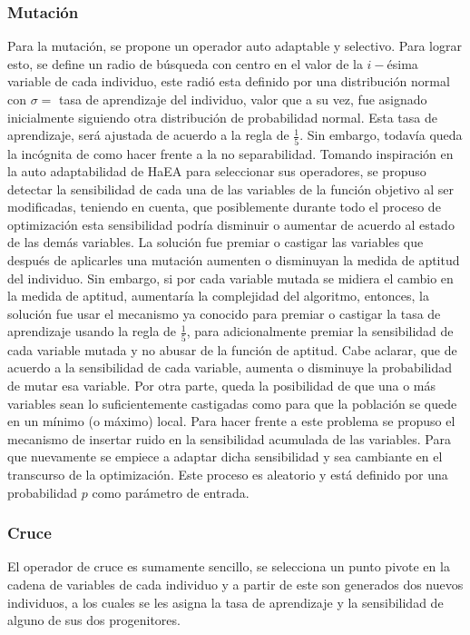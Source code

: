 \documentclass{llncs}
\begin{document}
\subsubsection{Mutación}
Para la mutación, se propone un operador auto adaptable y selectivo. Para lograr esto, se define un radio de búsqueda con centro en el valor de la $i-$ésima variable de cada individuo, este radió esta definido por una distribución normal con $\sigma=$ tasa de aprendizaje del individuo, valor que a su vez, fue asignado inicialmente siguiendo otra distribución de probabilidad normal. Esta tasa de aprendizaje, será ajustada de acuerdo a la regla de $\frac{1}{5}$. Sin embargo, todavía queda la incógnita de como hacer frente a la no separabilidad. 
Tomando inspiración en la auto adaptabilidad de HaEA  \cite{gomez} para seleccionar sus operadores, se propuso detectar la sensibilidad de cada una de las variables de la función objetivo al ser modificadas, teniendo en cuenta, que posiblemente durante todo el proceso de optimización esta sensibilidad podría disminuir o aumentar de acuerdo al estado de las demás variables. La solución fue premiar o castigar las variables que después de aplicarles una mutación aumenten o disminuyan la medida de aptitud del individuo. Sin embargo, si por cada variable mutada se midiera el cambio en la medida de aptitud, aumentaría la complejidad del algoritmo, entonces, la solución fue usar el mecanismo ya conocido para premiar o castigar la tasa de aprendizaje usando la regla de $\frac{1}{5}$, para adicionalmente premiar la sensibilidad de cada variable mutada y no abusar de la función de aptitud.
Cabe aclarar, que de acuerdo a la sensibilidad de cada variable, aumenta o disminuye la probabilidad de mutar esa variable.
Por otra parte, queda la posibilidad de que una o más variables sean lo suficientemente castigadas como para que la población se quede en un mínimo (o máximo) local. Para hacer frente a este problema se propuso el mecanismo de insertar ruido en la sensibilidad acumulada de las variables. Para que nuevamente se empiece a adaptar dicha sensibilidad y sea cambiante en el transcurso de la optimización. Este proceso es aleatorio y está definido por una probabilidad $p$ como parámetro de entrada.

\subsubsection{Cruce}
El operador de cruce es sumamente sencillo, se selecciona un punto pivote en la cadena de variables de cada individuo y a partir de este son generados dos nuevos individuos, a los cuales se les asigna la tasa de aprendizaje y la sensibilidad de alguno de sus dos progenitores.
\end{document}
